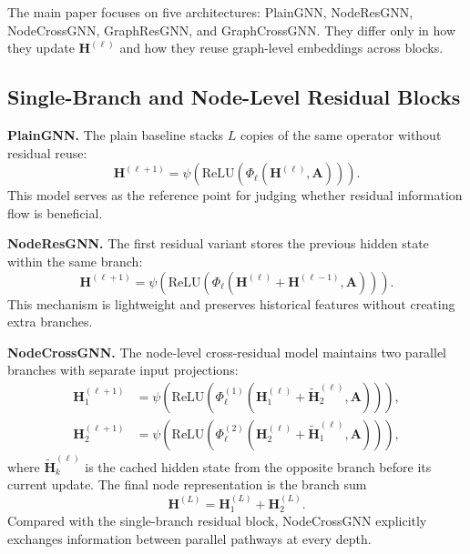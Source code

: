 The main paper focuses on five architectures: PlainGNN, NodeResGNN, NodeCrossGNN, GraphResGNN, and GraphCrossGNN. They differ only in how they update $\mathbf{H}^{(\ell)}$ and how they reuse graph-level embeddings across blocks.

\subsection{Single-Branch and Node-Level Residual Blocks}

\textbf{PlainGNN.} The plain baseline stacks $L$ copies of the same operator without residual reuse:
\begin{equation}
\mathbf{H}^{(\ell+1)} = \psi\!\left(\mathrm{ReLU}\!\left(\Phi_{\ell}\!\left(\mathbf{H}^{(\ell)}, \mathbf{A}\right)\right)\right).
\end{equation}
This model serves as the reference point for judging whether residual information flow is beneficial.

\textbf{NodeResGNN.} The first residual variant stores the previous hidden state within the same branch:
\begin{equation}
\mathbf{H}^{(\ell+1)} = \psi\!\left(\mathrm{ReLU}\!\left(\Phi_{\ell}\!\left(\mathbf{H}^{(\ell)} + \mathbf{H}^{(\ell-1)}, \mathbf{A}\right)\right)\right).
\end{equation}
This mechanism is lightweight and preserves historical features without creating extra branches.

\textbf{NodeCrossGNN.} The node-level cross-residual model maintains two parallel branches with separate input projections:
\begin{align}
\mathbf{H}^{(\ell+1)}_{1} &= \psi\!\left(\mathrm{ReLU}\!\left(\Phi^{(1)}_{\ell}\!\left(\mathbf{H}^{(\ell)}_{1} + \widetilde{\mathbf{H}}^{(\ell)}_{2}, \mathbf{A}\right)\right)\right), \\
\mathbf{H}^{(\ell+1)}_{2} &= \psi\!\left(\mathrm{ReLU}\!\left(\Phi^{(2)}_{\ell}\!\left(\mathbf{H}^{(\ell)}_{2} + \widetilde{\mathbf{H}}^{(\ell)}_{1}, \mathbf{A}\right)\right)\right),
\end{align}
where $\widetilde{\mathbf{H}}^{(\ell)}_{k}$ is the cached hidden state from the opposite branch before its current update. The final node representation is the branch sum
\begin{equation}
\mathbf{H}^{(L)} = \mathbf{H}^{(L)}_{1} + \mathbf{H}^{(L)}_{2}.
\end{equation}
Compared with the single-branch residual block, NodeCrossGNN explicitly exchanges information between parallel pathways at every depth.

